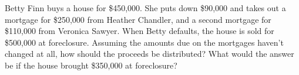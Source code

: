 \item
Betty Finn buys a house for \$450,000.  She puts down \$90,000 and takes out a
mortgage for \$250,000 from Heather Chandler, and a second mortgage for
\$110,000 from Veronica Sawyer.  When Betty defaults, the house is sold for
\$500,000 at foreclosure.  Assuming the amounts due on the mortgages haven't
changed at all, how should the proceeds be distributed?  What would the answer
be if the house brought \$350,000 at foreclosure?

